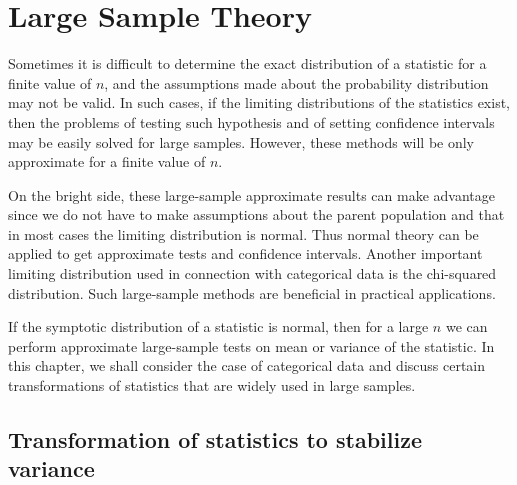 \chapter{Large Sample Theory}

Sometimes it is difficult to determine the exact distribution of a statistic for a finite value 
of $n$, and the assumptions made about the probability distribution may not be valid. 
In such cases, if the limiting distributions of the statistics exist, then the problems of testing 
such hypothesis and of setting confidence intervals may be easily solved for large samples.
However, these methods will be only approximate for a finite value of $n$.

On the bright side, these large-sample approximate results can make advantage since 
we do not have to make assumptions about the parent population and that in most cases 
the limiting distribution is normal. Thus normal theory can be applied to get 
approximate tests and confidence intervals. Another important 
limiting distribution used in connection with categorical data is the chi-squared distribution.
Such large-sample methods are beneficial in practical applications.

If the symptotic distribution of a statistic is normal, then for a large $n$ we can 
perform approximate large-sample tests on mean or variance of the statistic. In this chapter, we shall consider 
the case of categorical data and discuss certain transformations of statistics that are widely used in 
large samples.

\section{Transformation of statistics to stabilize variance}

